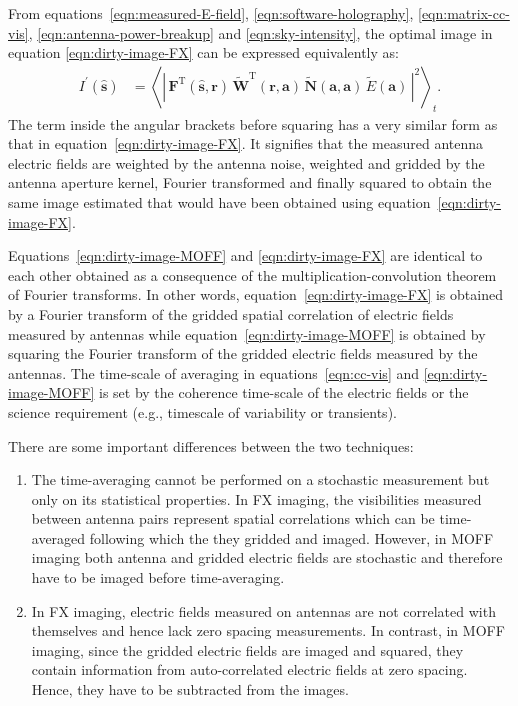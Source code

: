 \documentclass[a4paper,fleqn,usenatbib]{../mnras}
\begin{document}
From equations~\ref{eqn:measured-E-field}, \ref{eqn:software-holography}, \ref{eqn:matrix-cc-vis}, \ref{eqn:antenna-power-breakup} and \ref{eqn:sky-intensity}, the optimal image in equation \ref{eqn:dirty-image-FX} can be expressed equivalently as:
\begin{align}
  I^\prime(\hat{\mathbf{s}}) &= \left\langle \left|\,\mathbf{F}^\textrm{T}(\hat{\mathbf{s}},\mathbf{r})\,\widetilde{\mathbf{W}}^\textrm{T}(\mathbf{r},\mathbf{a})\,\widetilde{\mathbf{N}}(\mathbf{a},\mathbf{a})\,\widetilde{E}(\mathbf{a})\,\right|^2\right\rangle_t. \label{eqn:dirty-image-MOFF}
\end{align}
The term inside the angular brackets before squaring has a very similar form as that in equation~\ref{eqn:dirty-image-FX}. It signifies that the measured antenna electric fields are weighted by the antenna noise, weighted and gridded by the antenna aperture kernel, Fourier transformed and finally squared to obtain the same image estimated that would have been obtained using equation~\ref{eqn:dirty-image-FX}. 

Equations~\ref{eqn:dirty-image-MOFF} and \ref{eqn:dirty-image-FX} are identical to each other obtained as a consequence of the multiplication-convolution theorem of Fourier transforms. In other words, equation~\ref{eqn:dirty-image-FX} is obtained by a Fourier transform of the gridded spatial correlation of electric fields measured by antennas while equation~\ref{eqn:dirty-image-MOFF} is obtained by squaring the Fourier transform of the gridded electric fields measured by the antennas. The time-scale of averaging in equations~\ref{eqn:cc-vis} and \ref{eqn:dirty-image-MOFF} is set by the coherence time-scale of the electric fields or the science requirement (e.g., timescale of variability or transients).

There are some important differences between the two techniques:
\begin{enumerate}
  \item The time-averaging cannot be performed on a stochastic measurement but only on its statistical properties. In FX imaging, the visibilities measured between antenna pairs represent spatial correlations which can be time-averaged following which the they gridded and imaged. However, in MOFF imaging both antenna and gridded electric fields are stochastic and therefore have to be imaged before time-averaging. 
  \item In FX imaging, electric fields measured on antennas are not correlated with themselves and hence lack zero spacing measurements. In contrast, in MOFF imaging, since the gridded electric fields are imaged and squared, they contain information from auto-correlated electric fields at zero spacing. Hence, they have to be subtracted from the images.
\end{enumerate} 
\end{document}
